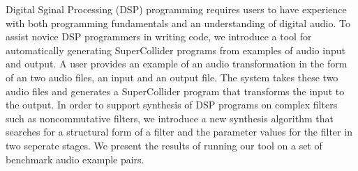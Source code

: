 Digital Sginal Processing (DSP) programming requires users to have experience with both programming fundamentals and an understanding of digital audio.
To assist novice DSP programmers in writing code, we introduce a tool for automatically generating SuperCollider programs from examples of audio input and output.
A user provides an example of an audio transformation in the form of an two audio files, an input and an output file.
The system takes these two audio files and generates a SuperCollider program that transforms the input to the output.
In order to support synthesis of DSP programs on complex filters such as noncommutative filters, we introduce a new synthesis algorithm that searches for a structural form of a filter and the parameter values for the filter in two seperate stages.
We present the results of running our tool on a set of benchmark audio example pairs.

